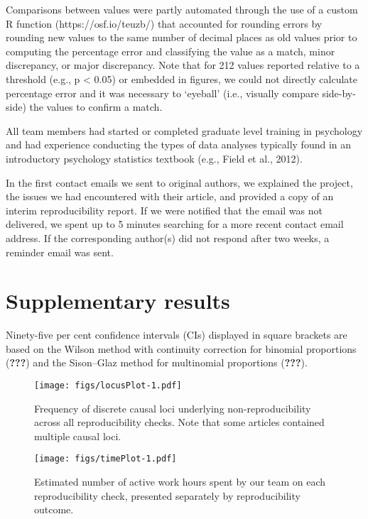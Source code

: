 \documentclass[english,,man,floatsintext]{apa6}
\begin{document}
\begin{appendix}
Comparisons between values were partly automated through the use of a
custom R function (https://osf.io/teuzb/) that accounted for rounding
errors by rounding new values to the same number of decimal places as
old values prior to computing the percentage error and classifying the
value as a match, minor discrepancy, or major discrepancy. Note that for
212 values reported relative to a threshold (e.g., p \textless{} 0.05)
or embedded in figures, we could not directly calculate percentage error
and it was necessary to `eyeball' (i.e., visually compare side-by-side)
the values to confirm a match.

All team members had started or completed graduate level training in
psychology and had experience conducting the types of data analyses
typically found in an introductory psychology statistics textbook (e.g.,
Field et al., 2012).

In the first contact emails we sent to original authors, we explained
the project, the issues we had encountered with their article, and
provided a copy of an interim reproducibility report. If we were
notified that the email was not delivered, we spent up to 5 minutes
searching for a more recent contact email address. If the corresponding
author(s) did not respond after two weeks, a reminder email was sent.

\hypertarget{sup_results}{%
\section{Supplementary results}\label{sup_results}}

Ninety-five per cent confidence intervals (CIs) displayed in square
brackets are based on the Wilson method with continuity correction for
binomial proportions ({\textbf{???}}) and the Sison--Glaz method for
multinomial proportions ({\textbf{???}}).

\begin{figure}
\centering
\texttt{[image: figs/locusPlot-1.pdf]}
\caption{\label{fig:locusPlot}Frequency of discrete causal loci underlying
non-reproducibility across all reproducibility checks. Note that some
articles contained multiple causal loci.}
\end{figure}

\begin{figure}
\centering
\texttt{[image: figs/timePlot-1.pdf]}
\caption{\label{fig:timePlot}Estimated number of active work hours spent by
our team on each reproducibility check, presented separately by
reproducibility outcome.}
\end{figure}


\end{appendix}
\end{document}
